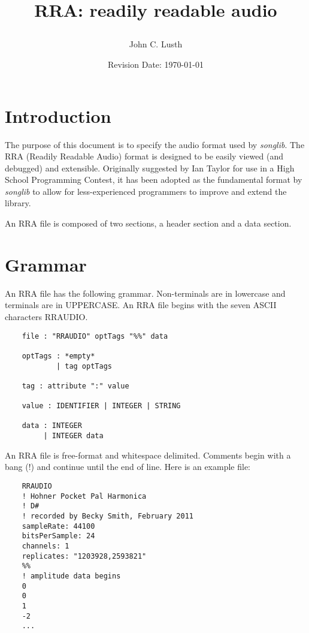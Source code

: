 \documentclass{article}
\title{RRA: readily readable audio\\
\date{Revision Date: \today}}
\author{John C. Lusth}
\begin{document}
\maketitle

\W\subsubsection*{}
\W\htmlrule

\section{Introduction}

The purpose of this document is to specify the audio format
used by {\it songlib}. The RRA (Readily Readable Audio) format is designed
to be easily viewed (and debugged) and extensible. Originally
suggested by Ian Taylor for use in a High School Programming
Contest, it has been adopted as the fundamental format by {\it songlib}
to allow for less-experienced programmers to improve and extend 
the library.

An RRA file is composed of two sections, a header section and
a data section.

\section{Grammar}

An RRA file has the following grammar. Non-terminals are in
lowercase and terminals are in UPPERCASE. An RRA file begins
with the seven ASCII characters RRAUDIO.

\begin{verbatim}
    file : "RRAUDIO" optTags "%%" data

    optTags : *empty*
            | tag optTags

    tag : attribute ":" value

    value : IDENTIFIER | INTEGER | STRING

    data : INTEGER
         | INTEGER data
\end{verbatim}

An RRA file is free-format and whitespace delimited.
Comments begin with a bang (!) and continue until the
end of line.  Here is an example file:

\begin{verbatim}
    RRAUDIO
    ! Hohner Pocket Pal Harmonica
    ! D#
    ! recorded by Becky Smith, February 2011
    sampleRate: 44100
    bitsPerSample: 24
    channels: 1
    replicates: "1203928,2593821"
    %%
    ! amplitude data begins
    0
    0
    1
    -2
    ...
\end{verbatim}
\end{document}

